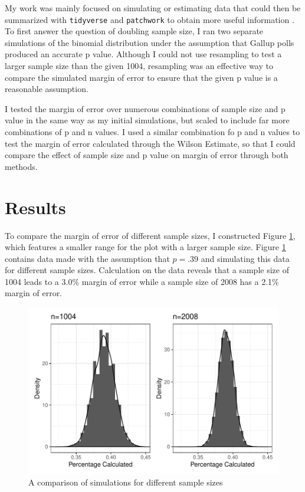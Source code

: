 \documentclass{article}\usepackage[]{graphicx}\usepackage[]{xcolor}
\begin{document}
\begin{multicols}{2}
My work was mainly focused on simulating or estimating data that could then be summarized with \texttt{tidyverse} and \texttt{patchwork} to obtain more useful information \citep{tidyverse,  patchwork}. To first answer the question of doubling sample size, I ran two separate simulations of the binomial distribution under the assumption that Gallup polls produced an accurate p value. Although I could not use resampling to test a larger sample size than the given 1004, resampling was an effective way to compare the simulated margin of error to ensure that the given p value is a reasonable assumption. 

I tested the margin of error over numerous combinations of sample size and p value in the same way as my initial simulations, but scaled to include far more combinations of p and n values. I used a similar combination fo p and n values to test the margin of error calculated through the Wilson Estimate, so that I could compare the effect of sample size and p value on margin of error through both methods.

\section{Results}

To compare the margin of error of different sample sizes, I constructed Figure \ref{plot1}, which features a smaller range for the plot with a larger sample size. Figure \ref{plot1} contains data made with the assumption that $p=.39$ and simulating this data for different sample sizes. Calculation on the data reveals that a sample size of 1004 leads to a 3.0\% margin of error while a sample size of 2008 has a 2.1\% margin of error. 

\begin{figure}[H]
 \begin{center}
 \includegraphics[scale=0.65]{part1_comparison.pdf}
 \caption{A comparison of simulations for different sample sizes}
 \label{plot1}
 \end{center}
 \end{figure}


\end{multicols}
\end{document}
